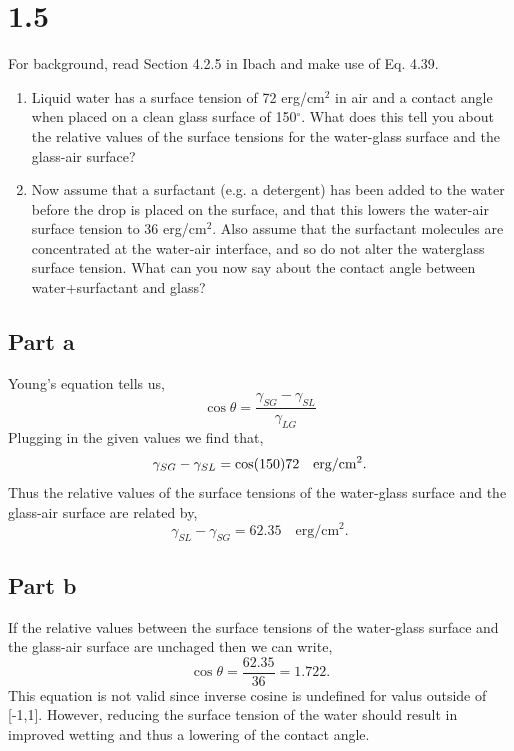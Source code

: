 \documentclass[12pt]{article}
\renewcommand{\=}[1]{\stackrel{#1}{=}} %
\theoremstyle{definition}
\theoremstyle{remark}
\begin{document}


\newpage
\section*{1.5}
\begin{bclogo}[logo=\bcquestion , barre=none]
\newline
For background, read Section 4.2.5 in Ibach and make use of Eq. 4.39.
\begin{enumerate}
\item  Liquid water has a surface tension of 72 erg/cm$^2$ in air and a contact angle when placed on a clean glass surface of 150$^\circ$. What does this tell you about the relative values of the surface tensions for the water-glass surface and the glass-air surface? 
\item Now assume that a surfactant (e.g. a detergent) has been added to the water before the drop is
placed on the surface, and that this lowers the water-air surface tension to 36 erg/cm$^2$. Also assume that the surfactant molecules are concentrated at the water-air interface, and so do not alter the waterglass surface tension. What can you now say about the contact angle between water+surfactant and glass?
\end{enumerate}
\end{bclogo}
\vspace{2cm}

\subsection*{Part a}
Young's equation tells us,
\[
	\cos\theta = \dfrac{\gamma_{SG} - \gamma_{SL}}{\gamma_{LG}}
\]
Plugging in the given values we find that,
\[
	\gamma_{SG} - \gamma_{SL} = \cos(150)72\quad \text{erg/cm$^2$}.\\[3mm]
\]
Thus the relative values of the surface tensions of the water-glass surface and the glass-air surface are related by,
\[
\boxed{\gamma_{SL} - \gamma_{SG} = 62.35 \quad \text{erg/cm$^2$}.}
\]
\subsection*{Part b}

If the relative values between the surface tensions of the water-glass surface and the glass-air surface are unchaged then we can write,
\[
\cos\theta = \dfrac{62.35}{36} = 1.722.
\]
This equation is not valid since inverse cosine is undefined for valus outside of [-1,1]. However, reducing the surface tension of the water should result in improved wetting and thus a lowering of the contact angle.
\end{document}
